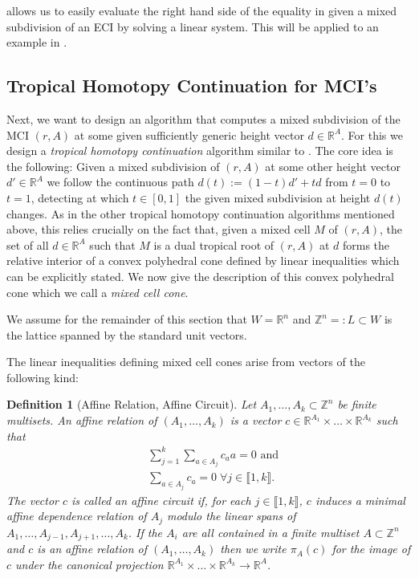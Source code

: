 \documentclass[a4paper]{article}
\newtheorem{definition}{Definition}
\theoremstyle{remark}
\def\RR{\mathbb{R}}
\def\ZZ{\mathbb{Z}}
\newcommand{\irng}[1]{\llbracket #1 \rrbracket}
\begin{document}
 allows us to easily evaluate the right hand
side of the equality in  given a mixed
subdivision of an ECI by solving a linear system. This will be applied
to an example in .

\subsection{Tropical Homotopy Continuation for MCI's}
\label{sec:tropcont}

Next, we want to design an algorithm that computes a mixed subdivision
of the MCI $(r,A)$ at some given sufficiently generic height vector
$d\in \RR^A$. For this we design a {\em tropical homotopy continuation}
algorithm similar to \cite{jensenTropicalHomotopyContinuation2016,
  malajovichComputingMixedVolume2017a,
  daiseyFrameworkGeneralizedTropical2024}. The core idea is the
following: Given a mixed subdivision of $(r,A)$ at some other height
vector $d'\in \RR^A$ we follow the continuous path
$d(t):=(1-t)d' + td$ from $t = 0$ to $t = 1$, detecting at which
$t\in [0,1]$ the given mixed subdivision at height $d(t)$ changes. As in
the other tropical homotopy continuation algorithms mentioned above,
this relies crucially on the fact that, given a mixed cell $M$ of
$(r,A)$, the set of all $d\in \RR^A$ such that $M$ is a dual tropical
root of $(r,A)$ at $d$ forms the relative interior of a convex
polyhedral cone defined by linear inequalities which can be explicitly
stated. We now give the description of this convex polyhedral cone which
we call a {\em mixed cell cone}.

We assume for the remainder of this section that $W = \RR^n$ and
$\ZZ^n =: L\subset W$ is the lattice spanned by the standard unit vectors.

The linear inequalities defining mixed cell cones arise from vectors
of the following kind:

\begin{definition}[Affine Relation, Affine Circuit]
  Let $A_1,\hdots,A_k\subset \ZZ^n$ be finite multisets. An {\em affine relation}
  of $(A_1,\hdots,A_k)$ is a vector $c\in \RR^{A_1}\times \hdots \times \RR^{A_k}$ such that
  \begin{align*}
    &\sum_{j=1}^k\sum_{a\in A_j}c_aa = 0\text{ and}\\
    &\sum_{a\in A_j}c_a=0\; \forall j\in \irng{1,k}.
  \end{align*}
  The vector $c$ is called an {\em affine circuit} if, for each
  $j\in \irng{1,k}$, $c$ induces a minimal affine dependence relation of
  $A_j$ modulo the linear spans of
  $A_1,\ldots,A_{j-1},A_{j+1},\ldots, A_k$.  If the $A_i$ are all contained in a
  finite multiset $A\subset \ZZ^n$ and $c$ is an affine relation of
  $(A_1,\hdots,A_k)$ then we write $\pi_A(c)$ for the image of $c$ under
  the canonical projection $\RR^{A_1}\times \hdots \times \RR^{A_k}\rightarrow \RR^A$.
\end{definition}
\end{document}
